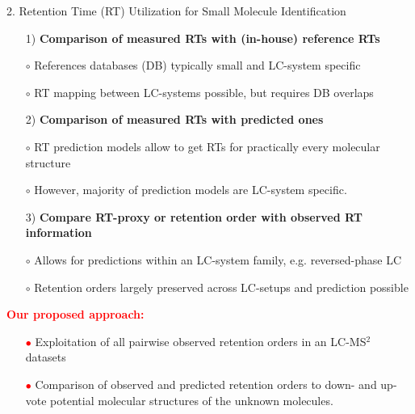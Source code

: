 \documentclass{beamer}
\newcommand{\ms}{MS}
\newcommand{\lc}{LC}
\newcommand{\msms}{\ms$^2$}
\newcommand{\lcmsms}{\lc-\msms}
\begin{document}
\begin{frame}{}
\begin{columns}[T]
    \begin{block}{{\normalsize 2. Retention Time (RT) Utilization for Small Molecule Identification}}
    \begin{itemize}
        \item[1)] \textbf{Comparison of measured RTs with (in-house) reference RTs}
        \item[$\circ$] References databases (DB) typically small and \lc-system specific
        \item[$\circ$] RT mapping between \lc-systems possible, but requires DB overlaps \cite{Stanstrup2015}
        \item[2)] \textbf{Comparison of measured RTs with predicted ones} \cite{Aicheler2015}  
        \item[$\circ$] RT prediction models allow to get RTs for practically every molecular structure
        \item[$\circ$] However, majority of prediction models are \lc-system specific. 
        \item[3)] \textbf{Compare RT-proxy or retention order with observed RT information} \cite{Ruttkies2016, Bach2018}
        \item[$\circ$] Allows for predictions within an \lc-system family, e.g. reversed-phase \lc
        \item[$\circ$] Retention orders largely preserved across \lc-setups and prediction possible 
    \end{itemize}
    \vspace{0.25cm}
    \textcolor{red}{\bf Our proposed approach:}
    \begin{itemize}
        \item[\textcolor{red}{$\bullet$}] Exploitation of all pairwise observed retention orders in an \lcmsms{} datasets
        \item[\textcolor{red}{$\bullet$}] Comparison of observed and predicted retention orders to down- and up-vote potential molecular structures of the unknown molecules.
    \end{itemize}

    \end{block}


\end{columns}
\end{frame}
\end{document}
